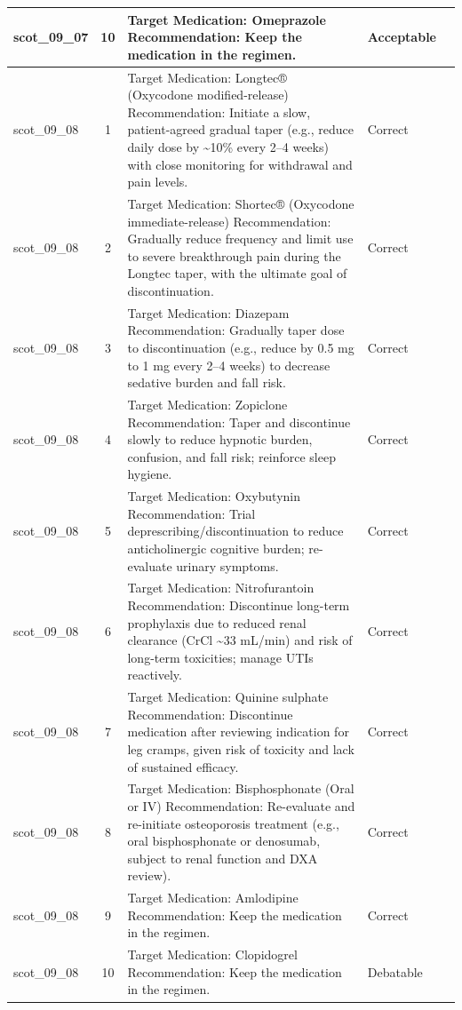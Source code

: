\begin{longtable}{|p{1.45cm}|c|p{10.2cm}|p{1.55cm}|p{2.3cm}|}
\hline
scot\_09\_07 & 10 & Target Medication: Omeprazole Recommendation: Keep the medication in the regimen. & Acceptable &  \\
\hline
scot\_09\_08 & 1 & Target Medication: Longtec® (Oxycodone modified-release) Recommendation: Initiate a slow, patient-agreed gradual taper (e.g., reduce daily dose by \textasciitilde{}10\% every 2–4 weeks) with close monitoring for withdrawal and pain levels. & Correct &  \\
\hline
scot\_09\_08 & 2 & Target Medication: Shortec® (Oxycodone immediate-release) Recommendation: Gradually reduce frequency and limit use to severe breakthrough pain during the Longtec taper, with the ultimate goal of discontinuation. & Correct &  \\
\hline
scot\_09\_08 & 3 & Target Medication: Diazepam Recommendation: Gradually taper dose to discontinuation (e.g., reduce by 0.5 mg to 1 mg every 2–4 weeks) to decrease sedative burden and fall risk. & Correct &  \\
\hline
scot\_09\_08 & 4 & Target Medication: Zopiclone Recommendation: Taper and discontinue slowly to reduce hypnotic burden, confusion, and fall risk; reinforce sleep hygiene. & Correct &  \\
\hline
scot\_09\_08 & 5 & Target Medication: Oxybutynin Recommendation: Trial deprescribing/discontinuation to reduce anticholinergic cognitive burden; re-evaluate urinary symptoms. & Correct &  \\
\hline
scot\_09\_08 & 6 & Target Medication: Nitrofurantoin Recommendation: Discontinue long-term prophylaxis due to reduced renal clearance (CrCl \textasciitilde{}33 mL/min) and risk of long-term toxicities; manage UTIs reactively. & Correct &  \\
\hline
scot\_09\_08 & 7 & Target Medication: Quinine sulphate Recommendation: Discontinue medication after reviewing indication for leg cramps, given risk of toxicity and lack of sustained efficacy. & Correct &  \\
\hline
scot\_09\_08 & 8 & Target Medication: Bisphosphonate (Oral or IV) Recommendation: Re-evaluate and re-initiate osteoporosis treatment (e.g., oral bisphosphonate or denosumab, subject to renal function and DXA review). & Correct &  \\
\hline
scot\_09\_08 & 9 & Target Medication: Amlodipine Recommendation: Keep the medication in the regimen. & Correct &  \\
\hline
scot\_09\_08 & 10 & Target Medication: Clopidogrel Recommendation: Keep the medication in the regimen. & Debatable &  \\

\end{longtable}
